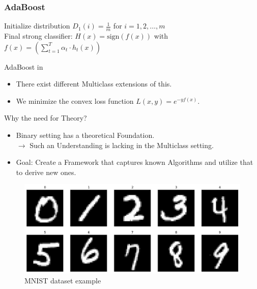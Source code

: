 \documentclass{beamer}
\begin{document}
\begin{frame}[fragile]
    \frametitle{AdaBoost}
    \small
    \begin{algorithm}[H]
        \captionsetup{labelformat=empty}
        Initialize distribution $D_1(i) = \frac{1}{m}$ for $i = 1, 2, \ldots, m$ \\
        Final strong classifier: $H(x) = \text{sign}(f(x))$ with $f(x) = \left(\sum_{t=1}^T \alpha_t \cdot h_t(x)\right)$
        \caption{AdaBoost in \cite{schapire2013explaining}}
    \end{algorithm}
    \begin{itemize}
        \item There exist different Multiclass extensions of this.
        \item We minimize the convex loss function $L(x,y) = e^{-yf(x)}$.
    \end{itemize}
\end{frame}


\begin{frame}{Why the need for Theory?}
    \centering
    \begin{itemize}
        \item Binary setting has a theoretical Foundation. \\
              $\rightarrow$ Such an Understanding is lacking in the Multiclass setting. \\
        \item Goal: Create a Framework that captures known Algorithms and utilize that to derive new ones.
    \end{itemize}
    \begin{figure}
        \includegraphics[width=0.8\linewidth]{images/mnist-486535952.png}
        \caption{\small MNIST dataset example}
        \label{fig:MNIST}
    \end{figure}
\end{frame}
\end{document}
